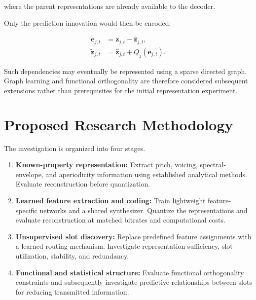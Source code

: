 \documentclass{article}
\begin{document}
where the parent representations are already available
to the decoder.

Only the prediction innovation would then be encoded:

\begin{equation}
    \boxed{
    \begin{aligned}
    \mathbf{e}_{j,t}
    &=
    \mathbf{z}_{j,t}
    -
    \hat{\mathbf{z}}_{j,t},
    \\
    \tilde{\mathbf{z}}_{j,t}
    &=
    \hat{\mathbf{z}}_{j,t}
    +
    Q_j(\mathbf{e}_{j,t}).
    \end{aligned}
    }
\end{equation}

Such dependencies may eventually be represented
using a sparse directed graph. Graph learning and
functional orthogonality are therefore considered
subsequent extensions rather than prerequisites
for the initial representation experiment.

\section{Proposed Research Methodology}

The investigation is organized into four stages.

\begin{enumerate}
    \item \textbf{Known-property representation:}
    Extract pitch, voicing, spectral-envelope,
    and aperiodicity information using established
    analytical methods. Evaluate reconstruction
    before quantization.

    \item \textbf{Learned feature extraction and coding:}
    Train lightweight feature-specific networks
    and a shared synthesizer. Quantize the
    representations and evaluate reconstruction
    at matched bitrates and computational costs.

    \item \textbf{Unsupervised slot discovery:}
    Replace predefined feature assignments with
    a learned routing mechanism. Investigate
    representation sufficiency, slot utilization,
    stability, and redundancy.

    \item \textbf{Functional and statistical structure:}
    Evaluate functional orthogonality constraints
    and subsequently investigate predictive
    relationships between slots for reducing
    transmitted information.
\end{enumerate}
\end{document}
